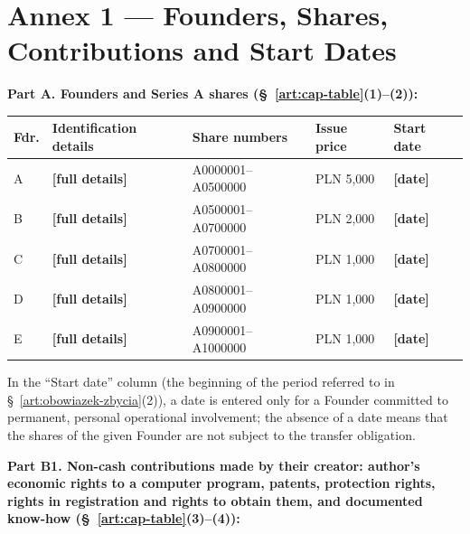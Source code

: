 \documentclass[12pt,a4paper]{report}
\newcommand{\field}[1]{\textbf{[#1]}}
\begin{document}
\newpage

\section*{Annex 1 --- Founders, Shares, Contributions and Start Dates}

\textbf{Part A. Founders and Series A shares (\S~\ref{art:cap-table}(1)--(2)):}

\begin{center}
\begin{tabularx}{\linewidth}{@{}p{0.9cm} >{\raggedright\arraybackslash}X p{4.2cm} p{1.9cm} p{2.3cm}@{}}
\toprule
\textbf{Fdr.} & \textbf{Identification details} & \textbf{Share numbers} & \textbf{Issue price} & \textbf{Start date} \\
\midrule
A & \field{full details} & A0000001--A0500000 & PLN 5,000 & \field{date} \\
B & \field{full details} & A0500001--A0700000 & PLN 2,000 & \field{date} \\
C & \field{full details} & A0700001--A0800000 & PLN 1,000 & \field{date} \\
D & \field{full details} & A0800001--A0900000 & PLN 1,000 & \field{date} \\
E & \field{full details} & A0900001--A1000000 & PLN 1,000 & \field{date} \\
\bottomrule
\end{tabularx}
\end{center}

In the ``Start date'' column (the beginning of the period referred to in \S~\ref{art:obowiazek-zbycia}(2)), a date is entered only for a Founder committed to permanent, personal operational involvement; the absence of a date means that the shares of the given Founder are not subject to the transfer obligation.

\textbf{Part B1. Non-cash contributions made by their creator: author's economic rights to a computer program, patents, protection rights, rights in registration and rights to obtain them, and documented know-how (\S~\ref{art:cap-table}(3)--(4)):}
\end{document}
